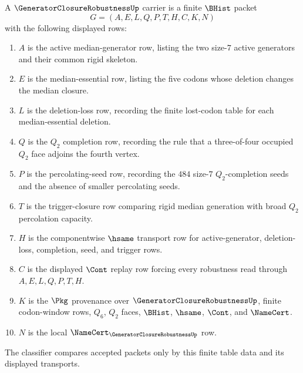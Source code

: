 \begin{definition}
\label{def:generator-closure-robustness-carrier}
A $\GeneratorClosureRobustnessUp$ carrier is a finite $\BHist$ packet
$$
G=(A,E,L,Q,P,T,H,C,K,N)
$$
with the following displayed rows:
\begin{enumerate}
\item $A$ is the active median-generator row, listing the two size-$7$ active generators and their common rigid skeleton.
\item $E$ is the median-essential row, listing the five codons whose deletion changes the median closure.
\item $L$ is the deletion-loss row, recording the finite lost-codon table for each median-essential deletion.
\item $Q$ is the $Q_{2}$ completion row, recording the rule that a three-of-four occupied $Q_{2}$ face adjoins the fourth vertex.
\item $P$ is the percolating-seed row, recording the $484$ size-$7$ $Q_{2}$-completion seeds and the absence of smaller percolating seeds.
\item $T$ is the trigger-closure row comparing rigid median generation with broad $Q_{2}$ percolation capacity.
\item $H$ is the componentwise $\hsame$ transport row for active-generator, deletion-loss, completion, seed, and trigger rows.
\item $C$ is the displayed $\Cont$ replay row forcing every robustness read through $A,E,L,Q,P,T,H$.
\item $K$ is the $\Pkg$ provenance over $\GeneratorClosureRobustnessUp$, finite codon-window rows, $Q_{6}$, $Q_{2}$ faces, $\BHist$, $\hsame$, $\Cont$, and $\NameCert$.
\item $N$ is the local $\NameCert_{\GeneratorClosureRobustnessUp}$ row.
\end{enumerate}
The classifier compares accepted packets only by this finite table data and its displayed transports.
\end{definition}


